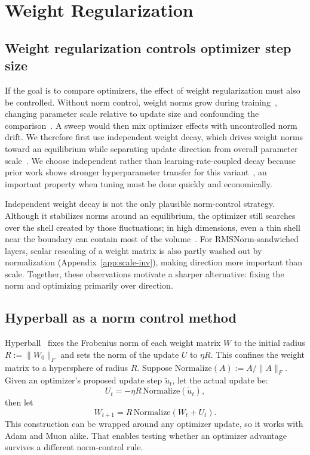 \documentclass{article}
\begin{document}
\section{Weight Regularization}
\label{sec:weight-reg}

\subsection{Weight regularization controls optimizer step size}
\label{sec:weight-decay}

If the goal is to compare optimizers, the effect of weight regularization must also be controlled. Without norm control, weight norms grow during training~\citep{hyperball}, changing parameter scale relative to update size and confounding the comparison~\citep{spectral-fl}. A sweep would then mix optimizer effects with uncontrolled norm drift. We therefore first use independent weight decay, which drives weight norms toward an equilibrium while separating update direction from overall parameter scale~\citep{wdeq,adamw,hyperball}. We choose independent rather than learning-rate-coupled decay because prior work shows stronger hyperparameter transfer for this variant~\citep{wdtransfer}, an important property when tuning must be done quickly and economically.

Independent weight decay is not the only plausible norm-control strategy. Although it stabilizes norms around an equilibrium, the optimizer still searches over the shell created by those fluctuations; in high dimensions, even a thin shell near the boundary can contain most of the volume~\citep{vershynin}. For RMSNorm-sandwiched layers, scalar rescaling of a weight matrix is also partly washed out by normalization (Appendix~\ref{app:scale-inv}), making direction more important than scale. Together, these observations motivate a sharper alternative: fixing the norm and optimizing primarily over direction.

\subsection{Hyperball as a norm control method}
\label{sec:hyperball}

Hyperball~\citep{hyperball} fixes the Frobenius norm of each weight matrix $W$ to the initial radius $R := \|W_0\|_F$ and sets the norm of the update $U$ to $\eta R$. This confines the weight matrix to a hypersphere of radius $R$. Suppose $\mathrm{Normalize}(A):=A/\|{A}\|_F$. Given an optimizer's proposed update step $\tilde u_t$, let the actual update be:
\[
U_t = -\eta R\,\mathrm{Normalize}(\tilde u_t),
\]
then let
\[
W_{t+1} = R\,\mathrm{Normalize}(W_t + U_t).
\]
This construction can be wrapped around any optimizer update, so it works with Adam and Muon alike. That enables testing whether an optimizer advantage survives a different norm-control rule.
\end{document}
